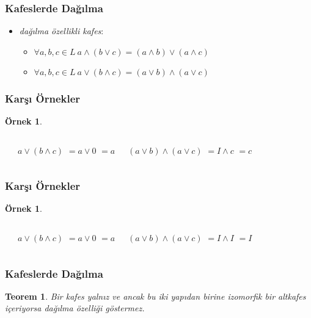 \documentclass[dvipsnames]{beamer}
\theoremstyle{definition}
\theoremstyle{example}
\newtheorem{ornek}[theorem]{Örnek}
\theoremstyle{plain}
\newtheorem{teorem}[theorem]{Teorem}
\begin{document}
\begin{frame}
  \frametitle{Kafeslerde Dağılma}

  \begin{itemize}
    \item \emph{dağılma özellikli kafes}:
    \begin{itemize}
      \item $\forall a,b,c \in L~a \wedge (b \vee c) = (a \wedge b) \vee (a \wedge c)$
      \item $\forall a,b,c \in L~a \vee (b \wedge c) = (a \vee b) \wedge (a \vee c)$
    \end{itemize}
  \end{itemize}
\end{frame}

\begin{frame}
  \frametitle{Karşı Örnekler}

  \begin{ornek}
    \begin{columns}
      \begin{center}
      \end{center}

      \pause
      $a \vee (b \wedge c)$ \pause $= a \vee 0$ \pause $= a$

      \pause
      $(a \vee b) \wedge (a \vee c)$ \pause $= I \wedge c$ \pause $= c$
    \end{columns}
  \end{ornek}
\end{frame}

\begin{frame}
  \frametitle{Karşı Örnekler}

  \begin{ornek}
    \begin{columns}
      \begin{center}
      \end{center}

      \pause
      $a \vee (b \wedge c)$ \pause $= a \vee 0$ \pause $= a$

      \pause
      $(a \vee b) \wedge (a \vee c)$ \pause $= I \wedge I$ \pause $= I$
    \end{columns}
  \end{ornek}
\end{frame}

\begin{frame}
  \frametitle{Kafeslerde Dağılma}

  \begin{teorem}
    Bir kafes yalnız ve ancak bu iki yapıdan birine izomorfik bir altkafes içeriyorsa dağılma
    özelliği göstermez.
  \end{teorem}
\end{frame}
\end{document}
